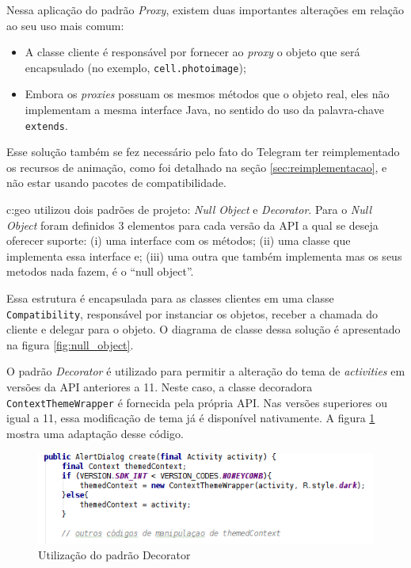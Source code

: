 Nessa aplicação do padrão \textit{Proxy}, existem duas importantes alterações em
relação ao seu uso mais comum:
\begin{itemize}
    \item A classe cliente é responsável por fornecer ao \textit{proxy} o objeto
        que será encapsulado (no exemplo, \texttt{cell.photoimage});
    \item Embora os \textit{proxies} possuam os mesmos métodos que o objeto real,
    eles não implementam a mesma interface Java, no sentido do uso da palavra-chave \texttt{extends}.
\end{itemize}

Esse solução também se fez necessário pelo fato do Telegram ter reimplementado os
recursos de animação, como foi detalhado na seção \ref{sec:reimplementacao},
e não estar usando pacotes de compatibilidade.

c:geo utilizou dois padrões de projeto: \textit{Null Object} e \textit{Decorator}.
Para o \textit{Null Object} foram definidos 3 elementos para cada versão da API
a qual se deseja oferecer suporte: (i) uma interface com os métodos; (ii) uma
classe que implementa essa interface e; (iii) uma outra que também implementa mas
os seus metodos nada fazem, é o “null object”.

Essa estrutura é encapsulada para as classes clientes em uma classe \texttt{Compatibility},
responsável por instanciar os objetos, receber a chamada do cliente e delegar para
o objeto. O diagrama de classe dessa solução é apresentado na figura \ref{fig:null_object}.

O padrão \textit{Decorator} é utilizado para permitir a alteração do tema de
\textit{activities} em versões da API anteriores a 11. Neste caso, a classe decoradora
\texttt{ContextThemeWrapper} é fornecida pela própria API. Nas versões superiores
ou igual a 11, essa modificação de tema já é disponível nativamente.
A figura \ref{fig:decorator} mostra uma adaptação desse código.

\begin{figure}[ht]
\centering
\includegraphics[width=1\textwidth]{imagens/decorator.png}
\caption{Utilização do padrão Decorator}
\label{fig:decorator}
\end{figure}

